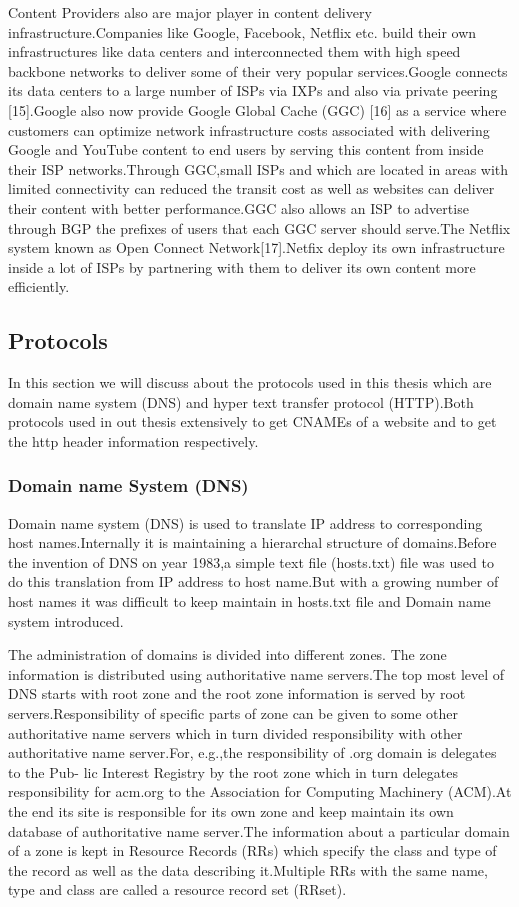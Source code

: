 Content Providers also are major player in content delivery infrastructure.Companies like Google, Facebook, Netflix etc. build their own infrastructures like data centers and interconnected them with high speed backbone networks to deliver some of their very popular services.Google connects its data centers to a large number of ISPs via IXPs and also via private peering [15].Google also now provide Google Global Cache (GGC) [16] as a service where customers can  optimize network infrastructure costs associated with delivering Google and YouTube content to end users by serving this content from inside their ISP networks.Through GGC,small ISPs and which are located in areas with limited connectivity can reduced the transit cost as well as websites can deliver their content with better performance.GGC also allows an ISP to advertise through BGP the prefixes of users that each GGC server should serve.The Netflix system known as Open Connect Network[17].Netfix deploy its own infrastructure inside a lot of ISPs by partnering with them to deliver its own content more efficiently. 
 
\subsection{Protocols}
In this section we will discuss about the protocols used in this thesis which
are domain name system (DNS) and hyper text transfer protocol (HTTP).Both
protocols used in out thesis extensively to get CNAMEs of a website and to get the http header information respectively.
\subsubsection{Domain name System (DNS)}
Domain name system (DNS) is used to translate IP address to corresponding
host names.Internally it is maintaining a hierarchal structure of domains.Before
the invention of DNS on year 1983,a simple text file (hosts.txt) file was used to
do this translation from IP address to host name.But with a growing number of host names it was difficult to keep maintain in hosts.txt file and Domain name
system introduced.

The administration of domains is divided into different zones. The zone
information is distributed using authoritative name servers.The top most level
of DNS starts with root zone and the root zone information is served by root
servers.Responsibility of specific parts of zone can be given to some other authoritative name servers which in turn divided responsibility with other authoritative
name server.For, e.g.,the responsibility of .org domain is delegates to the Pub-
lic Interest Registry by the root zone which in turn delegates responsibility for
acm.org to the Association for Computing Machinery (ACM).At the end its site
is responsible for its own zone and keep maintain its own database of authoritative name server.The information about a particular domain of a zone is kept in
Resource Records (RRs) which specify the class and type of the record as well
as the data describing it.Multiple RRs with the same name, type and class are
called a resource record set (RRset).

